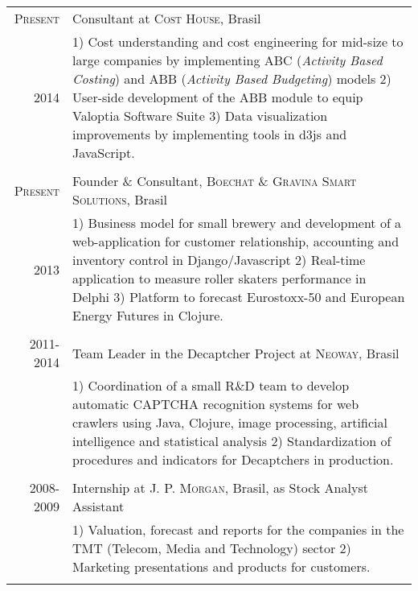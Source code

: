 \documentclass[a4paper,10pt]{article} %
\begin{document}
\begin{tabular}{r|p{11cm}}
\textsc{Present} & Consultant at \textsc{Cost House}, Brasil \\
\textsc{2014} & \footnotesize{1) Cost understanding and cost
  engineering for mid-size to large companies by implementing ABC (\textit{Activity Based
  Costing}) and ABB (\textit{Activity Based Budgeting}) models 2)
  User-side development of the ABB module to equip Valoptia Software
  Suite 3) Data visualization improvements by implementing tools in d3js and JavaScript. }\\
\multicolumn{2}{c}{} \\


\textsc{Present} & Founder \& Consultant, \textsc{Boechat \&
  Gravina Smart Solutions}, Brasil \\
\textsc{2013} & \footnotesize{1) Business model for small brewery and
  development of a web-application for
  customer relationship, accounting and inventory control in Django/Javascript
  2) Real-time application to measure roller skaters performance in Delphi
  3) Platform to forecast Eurostoxx-50 and European Energy Futures in Clojure. }
\\
\multicolumn{2}{c}{} \\


\textsc{2011-2014} & Team Leader in the Decaptcher Project at
\textsc{Neoway}, Brasil \\
& \footnotesize{1) Coordination of a small R\&D team to develop automatic
  CAPTCHA recognition systems for web crawlers using Java, Clojure,
  image processing, artificial intelligence and statistical analysis
  2) Standardization of procedures and
  indicators for Decaptchers in production. } \\
\multicolumn{2}{c}{} \\


\textsc{2008-2009} & Internship at \textsc{J. P. Morgan}, Brasil, as Stock
Analyst Assistant \\
& \footnotesize{1) Valuation, forecast and reports for the companies in the TMT (Telecom, Media and Technology)
  sector 2) Marketing presentations and products for customers.}\\
\multicolumn{2}{c}{} \\


\end{tabular}
\end{document}
